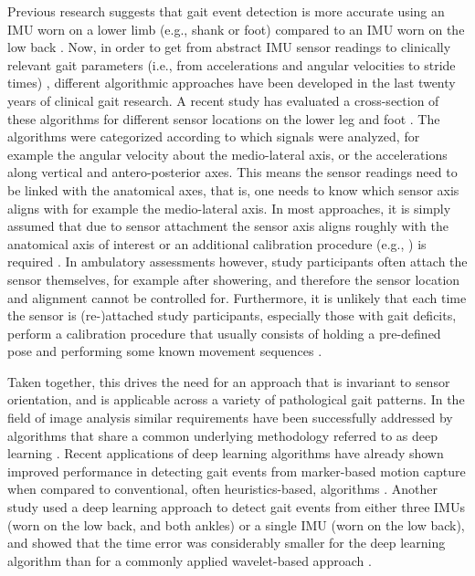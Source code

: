 \documentclass[sensors,article,submit,pdftex,moreauthors]{Definitions/mdpi}
\begin{document}
Previous research suggests that gait event detection is more accurate using an IMU worn on a lower limb (e.g., shank or foot) compared to an IMU worn on the low back \cite{BenMansour2015,Storm2016,Panebianco2018}. Now, in order to get from abstract IMU sensor readings to clinically relevant gait parameters (i.e., from accelerations and angular velocities to stride times) \cite{Hannink2016}, different algorithmic approaches have been developed in the last twenty years of clinical gait research. A recent study has evaluated a cross-section of these algorithms for different sensor locations on the lower leg and foot \cite{Niswander2021}. The algorithms were categorized according to which signals were analyzed, for example the angular velocity about the medio-lateral axis, or the accelerations along vertical and antero-posterior axes. This means the sensor readings need to be linked with the anatomical axes, that is, one needs to know which sensor axis aligns with for example the medio-lateral axis. In most approaches, it is simply assumed that due to sensor attachment the sensor axis aligns roughly with the anatomical axis of interest \cite{Salarian2004,Sabatini2005,Jasiewicz2006,Catalfamo2010,Trojaniello2014,Maqbool2016,Romijnders2021} or an additional calibration procedure (e.g., \cite{Ferraris1995}) is required \cite{Greene2010,Niswander2021}. In ambulatory assessments however, study participants often attach the sensor themselves, for example after showering, and therefore the sensor location and alignment cannot be controlled for. Furthermore, it is unlikely that each time the sensor is (re-)attached study participants, especially those with gait deficits, perform a calibration procedure that usually consists of holding a pre-defined pose and performing some known movement sequences \cite{Leineweber2019,Pacher2020}. 

Taken together, this drives the need for an approach that is invariant to sensor orientation, and is applicable across a variety of pathological gait patterns. In the field of image analysis similar requirements have been successfully addressed by algorithms that share a common underlying methodology referred to as deep learning \cite{LeCun2015,Hannink2016,TerHaarRomeny2019}. Recent applications of deep learning algorithms have already shown improved performance in detecting gait events from marker-based motion capture when compared to conventional, often heuristics-based, algorithms \cite{Kidzinski2019,Lempereur2020,Filtjens2020}. Another study used a deep learning approach to detect gait events from either three IMUs (worn on the low back, and both ankles) or a single IMU (worn on the low back), and showed that the time error was considerably smaller for the deep learning algorithm than for a commonly applied wavelet-based approach \cite{Gadaleta2019}.
\end{document}
